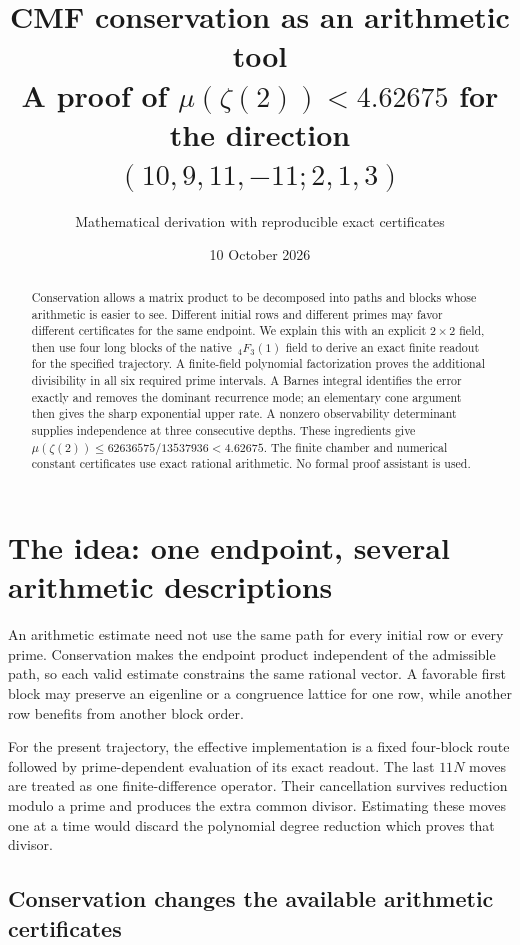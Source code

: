\documentclass[11pt]{article}
\title{CMF conservation as an arithmetic tool\\
\large A proof of $\mu(\zeta(2))<4.62675$ for the direction\\
$(10,9,11,-11;2,1,3)$}
\author{Mathematical derivation with reproducible exact certificates}
\date{10 October 2026}
\begin{document}
\maketitle
\begin{abstract}
Conservation allows a matrix product to be decomposed into paths and
blocks whose arithmetic is easier to see. Different initial rows and
different primes may favor different certificates for the same endpoint.
We explain this with an explicit $2\times2$ field, then use four long
blocks of the native $\,{}_4F_3(1)$ field to derive an exact finite
readout for the specified trajectory. A finite-field polynomial
factorization proves the additional divisibility in all six required
prime intervals. A Barnes integral identifies the error exactly and
removes the dominant recurrence mode; an elementary cone argument
then gives the sharp exponential upper rate. A nonzero observability
determinant supplies independence at three consecutive depths.
These ingredients give
$\mu(\zeta(2))\le62636575/13537936<4.62675$.
The finite chamber and numerical constant certificates use exact
rational arithmetic. No formal proof assistant is used.
\end{abstract}

\section{The idea: one endpoint, several arithmetic descriptions}
An arithmetic estimate need not use the same path for every initial row
or every prime. Conservation makes the endpoint product independent of
the admissible path, so each valid estimate constrains the same rational
vector. A favorable first block may preserve an eigenline or a congruence
lattice for one row, while another row benefits from another block order.

For the present trajectory, the effective implementation is a fixed
four-block route followed by prime-dependent evaluation of its exact
readout. The last $11N$ moves are treated as one finite-difference
operator. Their cancellation survives reduction modulo a prime and
produces the extra common divisor. Estimating these moves one at a time
would discard the polynomial degree reduction which proves that divisor.


\subsection{Conservation changes the available arithmetic certificates}
\end{document}
